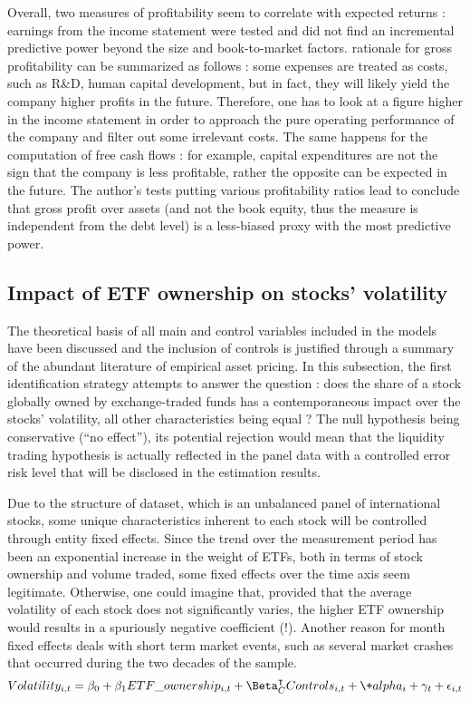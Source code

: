 Overall, two measures of profitability seem to correlate with expected returns : earnings from the income statement were tested and \cite{Fama2006} did not find an incremental predictive power beyond the size and book-to-market factors. \cite{Novy-Marx2013} rationale for gross profitability can be summarized as follows : some expenses are treated as costs, such as R\&D, human capital development, but in fact, they will likely yield the company higher profits in the future. Therefore, one has to look at a figure higher in the income statement in order to approach the pure operating performance of the company and filter out some irrelevant costs. The same happens for the computation of free cash flows : for example, capital expenditures are not the sign that the company is less profitable, rather the opposite can be expected in the future. The author's tests putting various profitability ratios lead to conclude that gross profit over assets (and not the book equity, thus the measure is independent from the debt level) is a less-biased proxy with the most predictive power.
\subsection{Impact of ETF ownership on stocks' volatility}
\label{subsec:Method:Volatility}
The theoretical basis of all main and control variables included in the models have been discussed and the inclusion of controls is justified through a summary of the abundant literature of empirical asset pricing. In this subsection, the first identification strategy attempts to answer the question : does the share of a stock globally owned by exchange-traded funds has a contemporaneous impact over the stocks' volatility, all other characteristics being equal ? The null hypothesis being conservative (``no effect''), its potential rejection would mean that the liquidity trading hypothesis is actually reflected in the panel data with a controlled error risk level that will be disclosed in the estimation results.

Due to the structure of dataset, which is an unbalanced panel of international stocks, some unique characteristics inherent to each stock will be controlled through entity fixed effects. Since the trend over the measurement period has been an exponential increase in the weight of ETFs, both in terms of stock ownership and volume traded, some fixed effects over the time axis seem legitimate. Otherwise, one could imagine that, provided that the average volatility of each stock does not significantly varies, the higher ETF ownership would results in a spuriously negative coefficient (!). Another reason for month fixed effects deals with short term market events, such as several market crashes that occurred during the two decades of the sample. 
\begin{equation}
  Volatility_{i,t} = \beta_{0} + \beta_{1}ETF\_ownership_{i, t} + \Beta_{C}^\intercal Controls_{i, t} + \+ alpha_{i} + \gamma_{t} + \epsilon_{i, t}
\end{equation}

